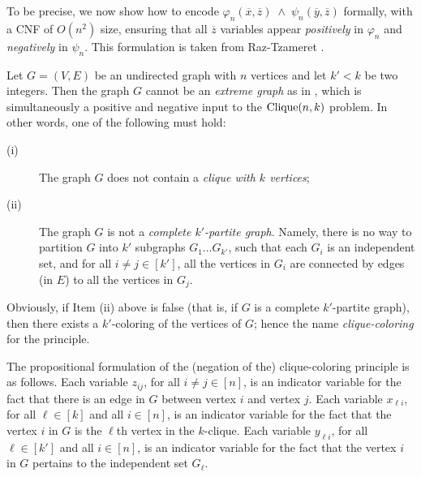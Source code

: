 To be precise, we now show how to encode 
$ \varphi_n(\overline{x},\overline{z}) \;\wedge\; \psi_n(\overline{y},\overline{z})$ formally, with a CNF of  \(O(n^2)\) size, ensuring that all \(\overline{z}\) variables appear \emph{positively} in \(\varphi_n\) and \emph{negatively} in \(\psi_n\).
This formulation is taken from Raz-Tzameret \cite{RT07}. 




Let $G=(V,E)$ be an undirected graph with $n$ vertices and let $k'<k$ be
two integers. Then the graph $G$ cannot be an \emph{extreme graph} as in , which is simultaneously a positive and negative input to the ${\rm Clique}(n,k)$ problem. In other words, one of the following must hold:
\begin{description}
\item[(i)] The graph $G$ does not contain a \emph{clique with $k$ vertices};

\item[(ii)] The graph $G$ is not a \emph{complete $k'$-partite graph}.
Namely, there is no way to partition $G$ into $k'$ subgraphs
$G_1\dots G_{k'}$,
such that each $G_i$ is an independent set, and for all $i\ne j \in[k']$,
all the vertices in $G_i$ are connected by edges (in $E$) to all the vertices in $G_j$.
\end{description}

Obviously, if Item (ii) above is false
(that is, if $G$ is a complete $k'$-partite graph),
then there exists a $k'$-coloring of
the vertices of $G$; hence the name \emph{clique-coloring} for the principle. 

The propositional formulation of the (negation of the)
clique-coloring principle is as follows.
Each variable $z_{ij}$, for all $i\ne j \in [n]$,
is an indicator variable for the fact that there is an edge in $G$
between vertex $i$ and vertex $j$.
Each variable $x_{\ell i}$, for all $\ell\in[k]$ and all $i\in[n]$,
is an indicator variable for the fact that the vertex $i$ in $G$
is the $\ell$th vertex in the $k$-clique.
Each variable $ y_{\ell i}$, for all $\ell\in[k']$ and all $i\in[n]$,
is an indicator variable for the fact that the vertex $i$ in $G$
pertains to the independent set $G_\ell$.

